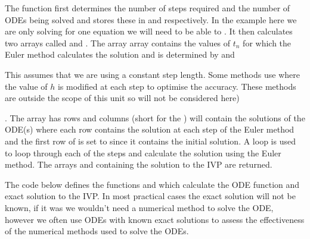 \documentclass[letterpaper,10pt,english]{jupyterBook}
\begin{document}
\sphinxAtStartPar
The function first determines the number of steps required and the number of ODEs being solved and stores these in  and  respectively. In the example here we are only solving for one equation we will need to be able to {\hyperref[\detokenize{1_IVPs/1.5_Higher_Order_ODEs:solving-systems-of-odes-section}]{}}. It then calculates two arrays called  and . The array  array contains the values of \(t_n\) for which the Euler method calculates the solution and is determined by  and %
\begin{footnote}[1]\sphinxAtStartFootnote
This assumes that we are using a constant step length. Some methods use  where the value of \(h\) is modified at each step to optimise the accuracy. These methods are outside the scope of this unit so will not be considered here)
%
\end{footnote}. The  array has  rows and  columns (short for the ) will contain the solutions of the ODE(s) where each row contains the solution at each step of the Euler method and the first row of  is set to  since it contains the initial solution. A  loop is used to loop through each of the steps and calculate the solution using the Euler method. The arrays  and  containing the solution to the IVP are returned.

\sphinxAtStartPar
The code below defines the functions  and  which calculate the ODE function and exact solution to the IVP. In most practical cases the exact solution will not be known, if it was we wouldn’t need a numerical method to solve the ODE, however we often use ODEs with known exact solutions to assess the effectiveness of the numerical methods used to solve the ODEs.
\end{document}
